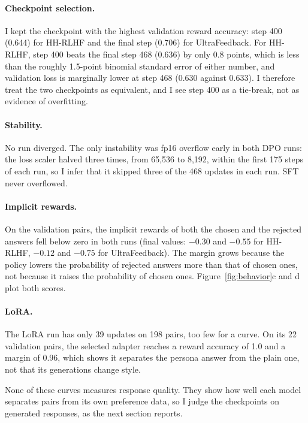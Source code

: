 \paragraph{Checkpoint selection.} I kept the checkpoint with the highest validation reward accuracy: step 400 (0.644) for HH-RLHF and the final step (0.706) for UltraFeedback. For HH-RLHF, step 400 beats the final step 468 (0.636) by only 0.8 points, which is less than the roughly 1.5-point binomial standard error of either number, and validation loss is marginally lower at step 468 (0.630 against 0.633). I therefore treat the two checkpoints as equivalent, and I see step 400 as a tie-break, not as evidence of overfitting.

\paragraph{Stability.} No run diverged. The only instability was fp16 overflow early in both DPO runs: the loss scaler halved three times, from 65,536 to 8,192, within the first 175 steps of each run, so I infer that it skipped three of the 468 updates in each run. SFT never overflowed.

\paragraph{Implicit rewards.} On the validation pairs, the implicit rewards of both the chosen and the rejected answers fell below zero in both runs (final values: $-0.30$ and $-0.55$ for HH-RLHF, $-0.12$ and $-0.75$ for UltraFeedback). The margin grows because the policy lowers the probability of rejected answers more than that of chosen ones, not because it raises the probability of chosen ones. Figure~\ref{fig:behavior}c and d plot both scores.

\paragraph{LoRA.} The LoRA run has only 39 updates on 198 pairs, too few for a curve. On its 22 validation pairs, the selected adapter reaches a reward accuracy of 1.0 and a margin of 0.96, which shows it separates the persona answer from the plain one, not that its generations change style.

None of these curves measures response quality. They show how well each model separates pairs from its own preference data, so I judge the checkpoints on generated responses, as the next section reports.
